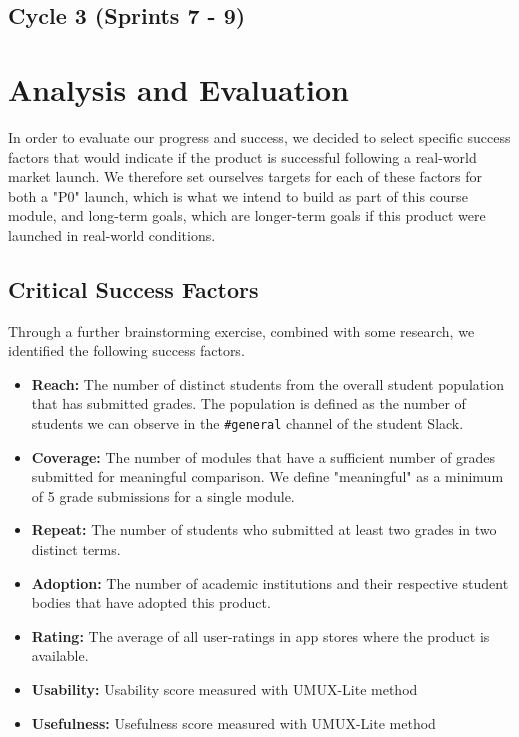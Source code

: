 \subsection{Cycle 3 (Sprints 7 - 9)}


\section{Analysis and Evaluation}
In order to evaluate our progress and success, we decided to select specific success factors that would indicate if the product is successful following a real-world market launch. We therefore set ourselves targets for each of these factors for both a "P0" launch, which is what we intend to build as part of this course module, and long-term goals, which are longer-term goals if this product were launched in real-world conditions.

\subsection{Critical Success Factors}
Through a further brainstorming exercise, combined with some research, we identified the following success factors.

\begin{itemize}
    \item \textbf{Reach:} The number of distinct students from the overall student population that has submitted grades. The population is defined as the number of students we can observe in the \texttt{\#general} channel of the student Slack. 
    \item \textbf{Coverage:} The number of modules that have a sufficient number of grades submitted for meaningful comparison. We define "meaningful" as a minimum of 5 grade submissions for a single module.
    \item \textbf{Repeat:} The number of students who submitted at least two grades in two distinct terms.
    \item \textbf{Adoption:} The number of academic institutions and their respective student bodies that have adopted this product.
   \item \textbf{Rating:} The average of all user-ratings in app stores where the product is available.
   \item \textbf{Usability:} Usability score measured with UMUX-Lite method
   \item \textbf{Usefulness:} Usefulness score measured with UMUX-Lite method
\end{itemize}


